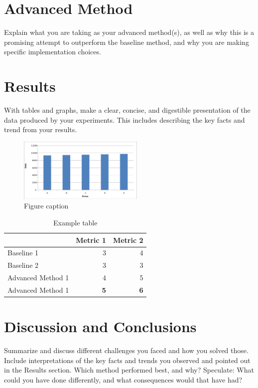 \documentclass[sigconf]{acmart}
\begin{document}
\section{Advanced Method}

Explain what you are taking as your advanced method(s), as well as why this is a promising attempt to outperform the baseline method, and why you are making specific implementation choices.

\section{Results}

With tables and graphs, make a clear, concise, and digestible presentation of the data produced by your experiments. This includes describing the key facts and trend from your results.


\begin{figure}[h]
    \includegraphics[width=6cm]{bar_graph.png}
    \caption{Figure caption}
    \label{figure:1}
\end{figure}


\begin{table}[h]
\begin{center}
\caption{Example table}
\begin{tabular}{l|rr}
     & Metric 1 & Metric 2 \\
    \hline
    Baseline 1 &  3 & 4 \\
    Baseline 2 &  3 & 3   \\
    Advanced Method 1 & 4 & 5 \\
    Advanced Method 1 & \textbf{5} & \textbf{6} 
\end{tabular}
\label{table:1}
\end{center}
\end{table}

\section{Discussion and Conclusions}

Summarize and discuss different challenges you faced and how you solved those. Include interpretations of the key facts and trends you observed and pointed out in the Results section. Which method performed best, and why? Speculate: What could you have done differently, and what consequences would that have had?
\end{document}
